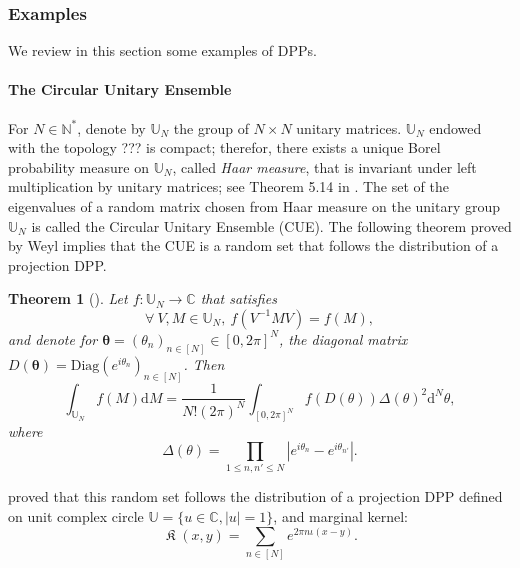 \documentclass[twoside,11pt]{book}
\newtheorem{theorem}{Theorem}
\numberwithin{theorem}{chapter}
\numberwithin{definition}{chapter}
\numberwithin{proposition}{chapter}
\numberwithin{corollary}{chapter}
\numberwithin{example}{chapter}
\numberwithin{lemma}{chapter}
\DeclareMathOperator*{\KDPP}{\mathfrak{K}}
\begin{document}
\subsubsection{Examples}
We review in this section some examples of DPPs.
\paragraph{The Circular Unitary Ensemble}


For $N \in \mathbb{N}^{*}$, denote by $\mathbb{U}_{N}$ the group of $N \times N$ unitary matrices. $\mathbb{U}_{N}$ endowed with the topology ??? is compact; therefor, there exists a unique Borel probability measure on $\mathbb{U}_{N}$, called \emph{Haar measure}, that is invariant under left multiplication by unitary matrices; see Theorem 5.14 in \citep{Rud91}. The set of the eigenvalues of a random matrix chosen from Haar measure on the unitary group $\mathbb{U}_{N}$ is called the Circular Unitary Ensemble (CUE). The following theorem proved by Weyl implies that the CUE is a random set that follows the distribution of a projection DPP. 



\begin{theorem}[\cite{Wey46}]
Let $f: \mathbb{U}_{N} \rightarrow \mathbb{C}$ that satisfies
\begin{equation}\label{eq:weil_condition}
\forall \: V, M \in \mathbb{U}_{N}, \:  f(V^{-1}M V) = f(M),
\end{equation}
and denote for $\bm{\theta} = (\theta_{n})_{n \in [N]} \in [0,2\pi]^{N}$, the diagonal matrix $D(\bm{\theta}) = \mathrm{Diag}(e^{i \theta_{n}})_{n \in [N]}$.
Then
\begin{equation}
\int_{\mathbb{U}_{N}}f(M) \mathrm{d}M = \frac{1}{N!(2 \pi)^{N}} \int_{[0,2\pi]^{N}} f(D(\theta)) \Delta(\theta)^{2} \mathrm{d}^{N}\theta,
\end{equation}
where 
\begin{equation}
\Delta(\theta) = \prod\limits_{1 \leq n,n' \leq N} | e^{i \theta_{n}} -e^{i \theta_{n'}} |.
\end{equation}
\end{theorem}



 \cite{Wey46} proved that this random set follows the distribution of a projection DPP defined on unit complex circle $\mathbb{U} = \{ u \in \mathbb{C}, |u| =1 \}$, and marginal kernel:
\begin{equation}
\KDPP(x,y) = \sum\limits_{n \in [N]} e^{2 \pi n \iota(x-y)}.
\end{equation}
\end{document}

